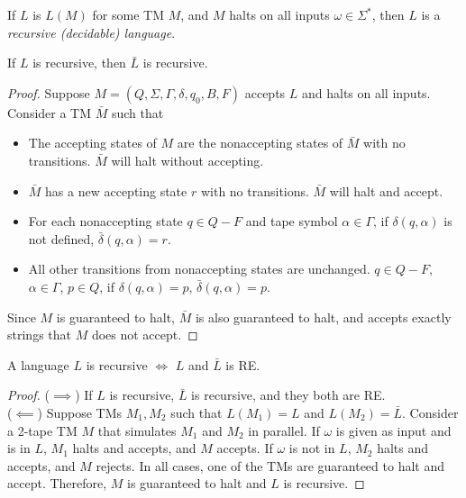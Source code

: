 \begin{definition}
  If $L$ is $L(M)$ for some TM $M$, and $M$ halts on all inputs $\omega\in \Sigma^{*}$,
  then $L$ is a \textit{recursive (decidable) language}.
\end{definition}

\begin{theorem}
  If $L$ is recursive, then $\bar{L}$ is recursive.
\end{theorem}
\begin{proof}
  Suppose $M=\left( Q,\Sigma,\Gamma,\delta,q_0,B,F \right) $ accepts $L$ and
  halts on all inputs. Consider a TM $\bar{M}$ such that
  \begin{itemize}
    \item The accepting states of $M$ are the nonaccepting states of $\bar{M}$
      with no transitions. $\bar{M}$ will halt without accepting.
    \item $\bar{M}$ has a new accepting state $r$ with no transitions.
      $\bar{M}$ will halt and accept.
    \item For each nonaccepting state $q\in Q-F$ and tape symbol $\alpha\in
      \Gamma$, if $\delta\left( q,\alpha \right) $ is not defined,
      $\bar{\delta}\left( q,\alpha \right) =r$.
    \item All other transitions from nonaccepting states are unchanged. $q\in
      Q-F$, $\alpha\in \Gamma$, $p\in Q$, if $\delta\left( q,\alpha \right)
      =p$, $\bar{\delta}\left( q,\alpha \right) =p$.
\end{itemize}
Since $M$ is guaranteed to halt, $\bar{M}$ is also guaranteed to halt, and
accepts exactly strings that $M$ does not accept.
\end{proof}

\begin{theorem}
  A language $L$ is recursive $\iff$ $L$ and $\bar{L}$ is RE.
\end{theorem}
\begin{proof}
  ($\implies$) If $L$ is recursive, $\bar{L}$ is recursive, and they both are RE.\\
  ($\impliedby$) Suppose TMs $M_1,M_2$ such that $L(M_1)=L$ and
  $L(M_2)=\bar{L}$. Consider a 2-tape TM $M$ that simulates $M_1$ and $M_2$ in
  parallel. If $\omega$ is given as input and is in $L$, $M_1$ halts and
  accepts, and $M$ accepts. If $\omega$ is not in $L$, $M_2$ halts and accepts,
  and $M$ rejects. In all cases, one of the TMs are guaranteed to halt and
  accept. Therefore, $M$ is guaranteed to halt and $L$ is recursive.
\end{proof}

